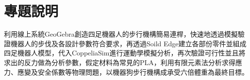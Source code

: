 \section{專題說明}
利用線上系統GeoGebra創造四足機器人的步行機構簡易連桿，快速地透過模擬驗證機器人的步伐及各設計參數符合要求，再透過Soild Edge建立各部份零件並組成四足機器人模型，代入CoppeliaSim進行運動學模擬分析，再次驗證可行性並且將求出的反力做為分析參數，假定材料為常見的PLA，利用有限元素法分析求得應力、應變及安全係數等物理問題，以機器狗步行機構成承受六倍體重為最終目標。\\

\renewcommand{\baselinestretch}{0.5} %
